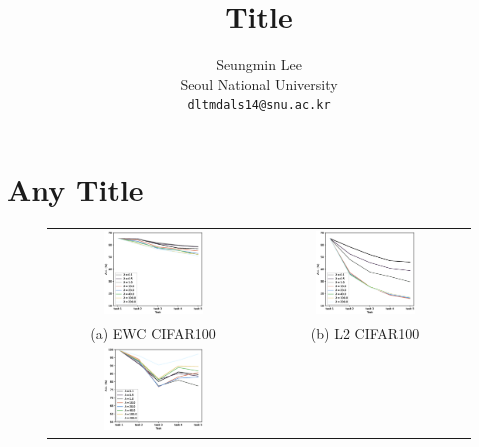 \documentclass[final]{cvpr}
\begin{document}
\renewcommand{\arraystretch}{1.1}
\title{\Large Title}

\author{Seungmin Lee\\
Seoul National University\\
{\tt\small dltmdals14@snu.ac.kr}
}

\onecolumn
\maketitle

\section{Any Title}

\begin{figure}[t]
	\begin{tabular}{c@{\hskip0.5cm}c}
		\includegraphics[width=0.5\textwidth]{resources/ewc_CIFAR.eps}&%
        \includegraphics[width=0.5\textwidth]{resources/l2_CIFAR.eps}\\%
        (a) EWC CIFAR100 & (b) L2 CIFAR100\\
        \includegraphics[width=0.5\textwidth]{resources/ewc_MNIST.eps}&%

\end{tabular}
\end{figure}
\end{document}
